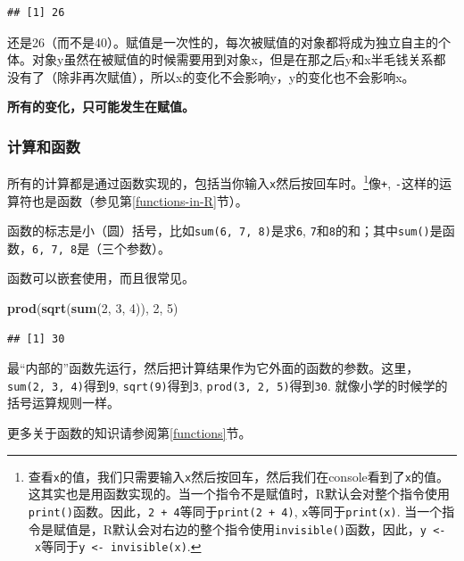 \documentclass[]{book}
\newenvironment{Shaded}{\begin{snugshade}}{\end{snugshade}}
\newcommand{\DecValTok}[1]{\textcolor[rgb]{0.00,0.00,0.81}{#1}}
\newcommand{\KeywordTok}[1]{\textcolor[rgb]{0.13,0.29,0.53}{\textbf{#1}}}
\newcommand{\NormalTok}[1]{#1}
\let\rmarkdownfootnote\footnote%
\def\footnote{\protect\rmarkdownfootnote}
\begin{document}
\begin{verbatim}
## [1] 26
\end{verbatim}

还是26（而不是40）。赋值是一次性的，每次被赋值的对象都将成为独立自主的个体。对象y虽然在被赋值的时候需要用到对象x，但是在那之后y和x半毛钱关系都没有了（除非再次赋值），所以x的变化不会影响y，y的变化也不会影响x。

\textbf{所有的变化，只可能发生在赋值。}

\subsubsection{计算和函数}

所有的计算都是通过函数实现的，包括当你输入\texttt{x}然后按回车时。\footnote{查看\texttt{x}的值，我们只需要输入\texttt{x}然后按回车，然后我们在console看到了\texttt{x}的值。这其实也是用函数实现的。当一个指令不是赋值时，R默认会对整个指令使用\texttt{print()}函数。因此，\texttt{2\ +\ 4}等同于\texttt{print(2\ +\ 4)}, \texttt{x}等同于\texttt{print(x)}. 当一个指令是赋值是，R默认会对右边的整个指令使用\texttt{invisible()}函数，因此，\texttt{y\ \textless{}-\ x}等同于\texttt{y\ \textless{}-\ invisible(x)}.}像\texttt{+}, \texttt{-}这样的运算符也是函数（参见第\ref{functions-in-R}节）。

函数的标志是小（圆）括号，比如\texttt{sum(6,\ 7,\ 8)}是求\texttt{6}, \texttt{7}和\texttt{8}的和；其中\texttt{sum()}是函数，\texttt{6,\ 7,\ 8}是（三个参数）。

函数可以嵌套使用，而且很常见。

\begin{Shaded}
\begin{Highlighting}[]
\KeywordTok{prod}\NormalTok{(}\KeywordTok{sqrt}\NormalTok{(}\KeywordTok{sum}\NormalTok{(}\DecValTok{2}\NormalTok{, }\DecValTok{3}\NormalTok{, }\DecValTok{4}\NormalTok{)), }\DecValTok{2}\NormalTok{, }\DecValTok{5}\NormalTok{)}
\end{Highlighting}
\end{Shaded}

\begin{verbatim}
## [1] 30
\end{verbatim}

最``内部的''函数先运行，然后把计算结果作为它外面的函数的参数。这里，\texttt{sum(2,\ 3,\ 4)}得到\texttt{9}, \texttt{sqrt(9)}得到\texttt{3}, \texttt{prod(3,\ 2,\ 5)}得到\texttt{30}. 就像小学的时候学的括号运算规则一样。

更多关于函数的知识请参阅第\ref{functions}节。
\end{document}
